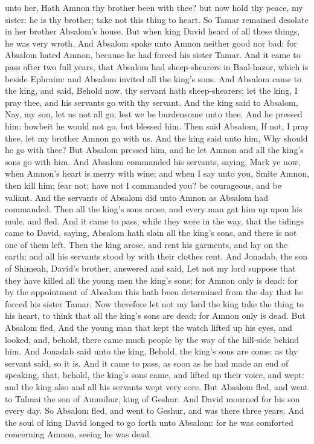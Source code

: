 unto her, Hath Amnon thy brother been with thee? but now hold thy peace, my sister: he is thy brother; take not this thing to heart. So Tamar remained desolate in her brother Absalom’s house. But when king David heard of all these things, he was very wroth. And Absalom spake unto Amnon neither good nor bad; for Absalom hated Amnon, because he had forced his sister Tamar.  And it came to pass after two full years, that Absalom had sheep-shearers in Baal-hazor, which is beside Ephraim: and Absalom invited all the king’s sons. And Absalom came to the king, and said, Behold now, thy servant hath sheep-shearers; let the king, I pray thee, and his servants go with thy servant. And the king said to Absalom, Nay, my son, let us not all go, lest we be burdensome unto thee. And he pressed him: howbeit he would not go, but blessed him. Then said Absalom, If not, I pray thee, let my brother Amnon go with us. And the king said unto him, Why should he go with thee? But Absalom pressed him, and he let Amnon and all the king’s sons go with him. And Absalom commanded his servants, saying, Mark ye now, when Amnon’s heart is merry with wine; and when I say unto you, Smite Amnon, then kill him; fear not; have not I commanded you? be courageous, and be valiant. And the servants of Absalom did unto Amnon as Absalom had commanded. Then all the king’s sons arose, and every man gat him up upon his mule, and fled.  And it came to pass, while they were in the way, that the tidings came to David, saying, Absalom hath slain all the king’s sons, and there is not one of them left. Then the king arose, and rent his garments, and lay on the earth; and all his servants stood by with their clothes rent. And Jonadab, the son of Shimeah, David’s brother, answered and said, Let not my lord suppose that they have killed all the young men the king’s sons; for Amnon only is dead: for by the appointment of Absalom this hath been determined from the day that he forced his sister Tamar. Now therefore let not my lord the king take the thing to his heart, to think that all the king’s sons are dead; for Amnon only is dead.  But Absalom fled. And the young man that kept the watch lifted up his eyes, and looked, and, behold, there came much people by the way of the hill-side behind him. And Jonadab said unto the king, Behold, the king’s sons are come: as thy servant said, so it is. And it came to pass, as soon as he had made an end of speaking, that, behold, the king’s sons came, and lifted up their voice, and wept: and the king also and all his servants wept very sore.  But Absalom fled, and went to Talmai the son of Ammihur, king of Geshur. And David mourned for his son every day. So Absalom fled, and went to Geshur, and was there three years. And the soul of king David longed to go forth unto Absalom: for he was comforted concerning Amnon, seeing he was dead. 

